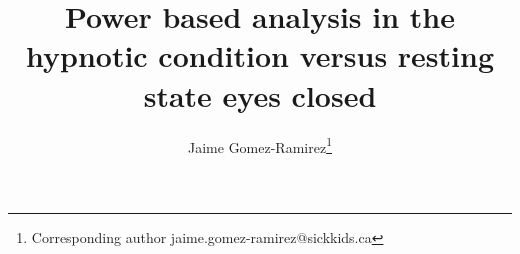 \documentclass[11pt, onecolumn]{article}
\begin{document}
\def\mean#1{\left< #1 \right>}
\title{Power based analysis in the hypnotic condition versus resting state eyes closed}

\author[1]{Jaime Gomez-Ramirez\thanks{Corresponding author \hspace{0.6cm} jaime.gomez-ramirez@sickkids.ca}}
\author[2]{}%
\affil[2]{}

\date{}
\maketitle
\end{document}
